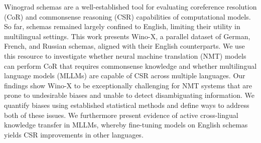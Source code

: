 Winograd schemas are a well-established tool for evaluating coreference resolution (CoR) and commonsense reasoning (CSR) capabilities of computational models. So far, schemas remained largely confined to English, limiting their utility in multilingual settings. This work presents Wino-X, a parallel dataset of German, French, and Russian schemas, aligned with their English counterparts. We use this resource to investigate whether neural machine translation (NMT) models can perform CoR that requires commonsense knowledge and whether multilingual language models (MLLMs) are capable of CSR across multiple languages. Our findings show Wino-X to be exceptionally challenging for NMT systems that are prone to undesirable biases and unable to detect disambiguating information. We quantify biases using established statistical methods and define ways to address both of these issues. We furthermore present evidence of active cross-lingual knowledge transfer in MLLMs, whereby fine-tuning models on English schemas yields CSR improvements in other languages.
